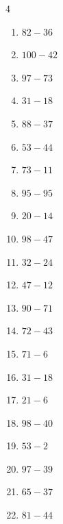 \begin{multicols}{4}
\begin{enumerate}
  \item $82-36$
        \phantom{$=46$}

  \item $100-42$
        \phantom{$=58$}

  \item $97-73$
        \phantom{$=24$}

  \item $31-18$
        \phantom{$=13$}

  \item $88-37$
        \phantom{$=51$}

  \item $53-44$
        \phantom{$=9$}

  \item $73-11$
        \phantom{$=62$}

  \item $95-95$
        \phantom{$=0$}

\columnbreak %

  \item $20-14$
        \phantom{$=6$}

  \item $98-47$
        \phantom{$=51$}

  \item $32-24$
        \phantom{$=8$}

  \item $47-12$
        \phantom{$=35$}

  \item $90-71$
        \phantom{$=19$}

  \item $72-43$
        \phantom{$=29$}

  \item $71-6$
        \phantom{$=65$}

  \item $31-18$
        \phantom{$=13$}

  \item $21-6$
        \phantom{$=15$}

  \item $98-40$
        \phantom{$=58$}

  \item $53-2$
        \phantom{$=51$}

  \item $97-39$
        \phantom{$=58$}

  \item $65-37$
        \phantom{$=28$}

  \item $81-44$
        \phantom{$=37$}


\end{enumerate}
\end{multicols}
